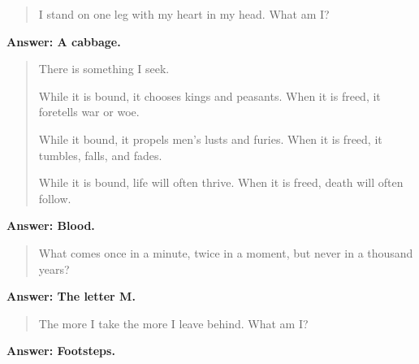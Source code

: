 \begin{multicols}{2}
{  \begin{quotation}
  I stand on one leg with my heart in my head.
  What am I?
  \end{quotation}

  \textbf{Answer: A cabbage.}

  \begin{quotation}

    There is something I seek.

    While it is bound, it chooses kings and peasants.
    When it is freed, it foretells war or woe.

    While it bound, it propels men's lusts and furies.
    When it is freed, it tumbles, falls, and fades.

    While it is bound, life will often thrive.
    When it is freed, death will often follow.

  \end{quotation}

  \textbf{Answer: Blood.}

}{


  \begin{quotation}
  What comes once in a minute, twice in a moment, but never in a thousand years?
  \end{quotation}

  \textbf{Answer: The letter M.}

  \begin{quotation}
    The more I take the more I leave behind.
    What am I?
  \end{quotation}

  \textbf{Answer: Footsteps.}

}

\iftoggle{oneshot}{
  \begin{quotation}
    David's father has three sons: Snap, Crackle, and  \ldots?
  \end{quotation}

  \textbf{Answer: David.}

  \begin{quotation}
  Tall I am young, Short I am old, While with life I glow, Wind is my foe. What am I?
  \end{quotation}

  \textbf{Answer: A candle.}
}{
  \begin{quotation}
  You must give me in order to keep me.
  What am I? 
  \end{quotation}

  \textbf{Answer: Your word.}

}
\end{multicols}
